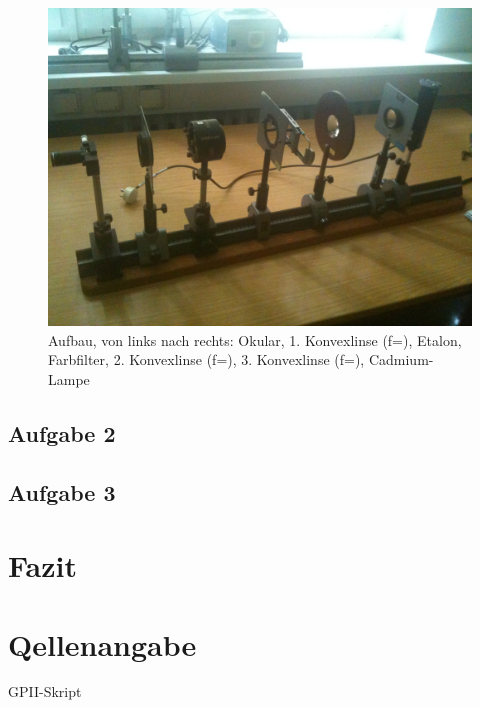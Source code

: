 \documentclass{article}
\begin{document}
\begin{figure}[H]
\includegraphics[scale=0.2]{IMG_0021}
\caption{Aufbau, von links nach rechts: Okular, 1. Konvexlinse (f=), Etalon, Farbfilter, 2. Konvexlinse (f=), 3. Konvexlinse (f=), Cadmium-Lampe}
\end{figure}

\subsection{Aufgabe 2}

\subsection{Aufgabe 3}



\section{Fazit}
\section{Qellenangabe}
GPII-Skript\\
\end{document}
